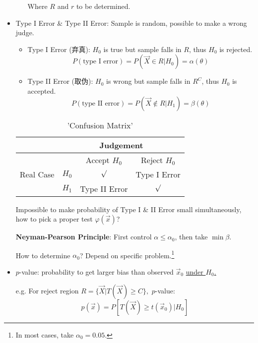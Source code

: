 \begin{itemize}[topsep = -3 pt]
\begin{itemize}
        Where $R$ and $r$  to be determined.
    \end{itemize}
        \item Type I Error \& Type II Error: Sample is random, possible to make a wrong judge.
            
        \begin{itemize}[topsep = -4 pt]
            \item Type I Error (弃真): $H_0$ is true but sample falls in $R$, thus $H_0$ is rejected.
            \[P(\text{type I error})=P(\vec{X}\in R|H_0)=\alpha(\theta)\]
            \item Type II Error (取伪): $H_0$ is wrong but sample falls in $R^C$, thus $H_0$ is accepted.
            \[P(\text{type II error})=P(\vec{X}\notin R|H_1)=\beta(\theta)\]
        \end{itemize}

    \begin{table}[htbp]
        \centering
        \begin{tabular}{c|ccc}
            \hline
            &\multicolumn{3}{c}{Judgement}\\
            \hline
            \multirow{3}{*}{Real Case}&&Accept $H_0$&Reject $H_0$\\ 
            &$H_0$&$\surd$&Type I Error\\ 
            &$H_1$&Type II Error&$\surd$\\ 
            \hline
        \end{tabular}
        \caption{'Confusion Matrix'}
    \end{table}


        Impossible to make probability of Type I \& II Error small simultaneously, how to pick a proper test $\varphi(\vec{x})$? 
        
\begin{point}
            \textbf{Neyman-Pearson Principle}: First control $\alpha\leq\alpha_0$, then take $\min \beta$.
\end{point}


        How to determine $\alpha_0$? Depend on specific problem.\footnote{In most cases, take $\alpha_0=0.05$.}

        \item $p$-value: probability to get larger bias than observed $\vec{x}_0$ \uline{under $H_0$.}
        
        e.g. For reject region $R=\{\vec{X}|T(\vec{X})\geq C\},$ $p$-value:
        \[
            p(\vec{x})=P[T(\vec{X})\geq t(\vec{x}_0)|H_0]
        \]



\end{itemize}
